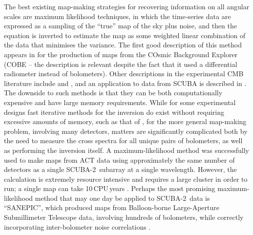\documentclass[useAMS,usenatbib,nofootinbib]{mn2e}
\newcommand{\scuba}{SCUBA-2}
\begin{document}
The best existing map-making strategies for recovering information on
all angular scales are maximum likelihood techniques, in which the
time-series data are expressed as a sampling of the ``true'' map of
the sky plus noise, and then the equation is inverted to estimate the
map as some weighted linear combination of the data that minimises the
variance.  The first good description of this method appears in
\citet{janssen1992} for the production of maps from the COsmic
Background Explorer (COBE -- the description is relevant despite the
fact that it used a differential radiometer instead of
bolometers). Other descriptions in the experimental CMB literature
include \citet{tegmark1997} and \citet{stompor2002}, and an
application to data from SCUBA is described in \citet{borys2004}.  The
downside to such methods is that they can be both computationally
expensive and have large memory requirements. While for some
experimental designs fast iterative methods for the inversion do exist
without requiring excessive amounts of memory, such as that of
\citet{wright1996} \citep[which was later implemented for SCUBA
by][]{johnstone2000}, for the more general map-making problem,
involving many detectors, matters are significantly complicated both
by the need to measure the cross spectra for all unique pairs of
bolometers, as well as performing the inversion itself. A
maximum-likelihood method was successfully used to make maps from ACT
data using approximately the same number of detectors as a single
\scuba\ subarray at a single wavelength. However, the calculation is
extremely resource intensive and requires a large cluster in order to
run; a single map can take 10\,CPU\,years \citep{fowler2010}. Perhaps
the most promising maximum-likelihood method that may one day be
applied to \scuba\ data is ``SANEPIC'', which produced maps from
Balloon-borne Large-Aperture Submillimeter Telescope data, involving
hundreds of bolometers, while correctly incorporating inter-bolometer
noise correlations \citep[][]{patanchon2008}.
\end{document}
